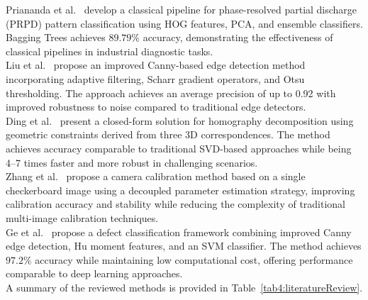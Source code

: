 \documentclass[11pt]{article}
\begin{document}
Priananda et al.~\cite{Priananda2024} develop a classical pipeline for
phase-resolved partial discharge (PRPD) pattern classification using HOG features,
PCA, and ensemble classifiers. Bagging Trees achieves $89.79\%$ accuracy,
demonstrating the effectiveness of classical pipelines in industrial diagnostic
tasks.\\

Liu et al.~\cite{Liu2024b} propose an improved Canny-based edge detection method
incorporating adaptive filtering, Scharr gradient operators, and Otsu thresholding.
The approach achieves an average precision of up to 0.92 with improved robustness
to noise compared to traditional edge detectors.\\

Ding et al.~\cite{Ding2025Homography} present a closed-form solution for
homography decomposition using geometric constraints derived from three 3D
correspondences. The method achieves accuracy comparable to traditional SVD-based
approaches while being 4--7 times faster and more robust in challenging scenarios.\\

Zhang et al.~\cite{Zhang2024Calibration} propose a camera calibration method
based on a single checkerboard image using a decoupled parameter estimation
strategy, improving calibration accuracy and stability while reducing the
complexity of traditional multi-image calibration techniques.\\

Ge et al.~\cite{Ge2025} propose a defect classification framework combining
improved Canny edge detection, Hu moment features, and an SVM classifier. The
method achieves $97.2\%$ accuracy while maintaining low computational cost,
offering performance comparable to deep learning approaches.\\

A summary of the reviewed methods is provided in
Table~\ref{tab4:literatureReview}.
\end{document}
